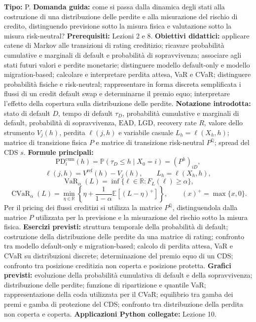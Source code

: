 \documentclass[12pt,a4paper]{article}%
\newcommand{\1}{\mathbf{1}}
\begin{document}
\textbf{Tipo:} P.\newline
\textbf{Domanda guida:} come si passa dalla dinamica degli stati alla
costruzione di una distribuzione delle perdite e alla misurazione del rischio
di credito, distinguendo previsione sotto la misura fisica e valutazione
sotto la misura risk-neutral?\newline
\textbf{Prerequisiti:} Lezioni 2 e 8.\newline
\textbf{Obiettivi didattici:} applicare catene di Markov alle transizioni di
rating creditizio; ricavare probabilit\`{a} cumulative e marginali di default
e probabilit\`{a} di sopravvivenza; associare agli stati futuri valori e
perdite monetarie; distinguere modello default-only e modello
migration-based; calcolare e interpretare perdita attesa, VaR e CVaR;
distinguere probabilit\`{a} fisiche e risk-neutral; rappresentare in forma
discreta semplificata i flussi di un credit default swap e determinarne il
premio equo; interpretare l'effetto della copertura sulla distribuzione delle
perdite.\newline
\textbf{Notazione introdotta:} stato di default $D$, tempo di default
$\tau_D$, probabilit\`{a} cumulative e marginali di default, probabilit\`{a}
di sopravvivenza, $\mathrm{EAD}$, $\mathrm{LGD}$, recovery rate $R$,
valore dello strumento $V_j(h)$, perdita $\ell(j,h)$ e variabile casuale
$L_h=\ell(X_h,h)$; matrice di transizione fisica $P$ e matrice di transizione
risk-neutral $P^{\mathbb{Q}}$; spread del CDS $s$.\newline
\textbf{Formule principali:}
\[
\mathrm{PD}_{i}^{\mathrm{cum}}(h)
=
\mathbb{P}(\tau_D\leq h\mid X_0=i)
=
(P^h)_{iD},
\]
\[
\ell(j,h)
=
V^{\mathrm{ref}}(h)-V_j(h),
\qquad
L_h=\ell(X_h,h),
\]
\[
\operatorname{VaR}_{\alpha}(L)
=
\inf\{\ell\in\mathbb{R}:F_L(\ell)\geq\alpha\},
\]
\[
\operatorname{CVaR}_{\alpha}(L)
=
\min_{\eta\in\mathbb{R}}
\left\{
\eta+
\frac{1}{1-\alpha}
\mathbb{E}\left[(L-\eta)^{+}\right]
\right\},
\qquad
(x)^{+}=\max\{x,0\}.
\]
Per il pricing dei flussi creditizi si utilizza la matrice
$P^{\mathbb{Q}}$, distinguendola dalla matrice $P$ utilizzata per la
previsione e la misurazione del rischio sotto la misura fisica.\newline
\textbf{Esercizi previsti:} struttura temporale della probabilit\`{a} di
default; costruzione della distribuzione delle perdite da una matrice di
rating; confronto tra modello default-only e migration-based; calcolo di
perdita attesa, VaR e CVaR su distribuzioni discrete; determinazione del
premio equo di un CDS; confronto tra posizione creditizia non coperta e
posizione protetta.\newline
\textbf{Grafici previsti:} evoluzione della probabilit\`{a} cumulativa di
default e della sopravvivenza; distribuzione delle perdite; funzione di
ripartizione e quantile VaR; rappresentazione della coda utilizzata per il
CVaR; equilibrio tra gamba dei premi e gamba di protezione del CDS; confronto
tra distribuzione della perdita non coperta e coperta.\newline
\textbf{Applicazioni Python collegate:} Lezione 10.
\end{document}
